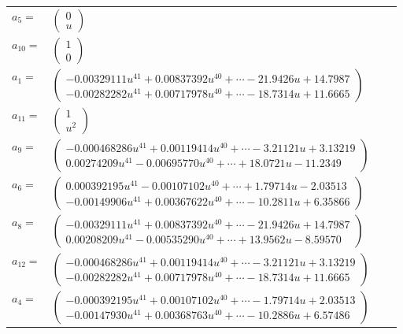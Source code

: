 \documentclass[1p]{elsarticle_modified}
\theoremstyle{definition}
\begin{document}
\begin{tabular}{m{7pt} m{180pt} m{7pt} m{180pt} }
\flushright $a_{5}=$&$\begin{pmatrix}0\\u\end{pmatrix}$ \\
\flushright $a_{10}=$&$\begin{pmatrix}1\\0\end{pmatrix}$ \\
\flushright $a_{1}=$&$\begin{pmatrix}-0.00329111 u^{41}+0.00837392 u^{40}+\cdots-21.9426 u+14.7987\\-0.00282282 u^{41}+0.00717978 u^{40}+\cdots-18.7314 u+11.6665\end{pmatrix}$ \\
\flushright $a_{11}=$&$\begin{pmatrix}1\\u^2\end{pmatrix}$ \\
\flushright $a_{9}=$&$\begin{pmatrix}-0.000468286 u^{41}+0.00119414 u^{40}+\cdots-3.21121 u+3.13219\\0.00274209 u^{41}-0.00695770 u^{40}+\cdots+18.0721 u-11.2349\end{pmatrix}$ \\
\flushright $a_{6}=$&$\begin{pmatrix}0.000392195 u^{41}-0.00107102 u^{40}+\cdots+1.79714 u-2.03513\\-0.00149906 u^{41}+0.00367622 u^{40}+\cdots-10.2811 u+6.35866\end{pmatrix}$ \\
\flushright $a_{8}=$&$\begin{pmatrix}-0.00329111 u^{41}+0.00837392 u^{40}+\cdots-21.9426 u+14.7987\\0.00208209 u^{41}-0.00535290 u^{40}+\cdots+13.9562 u-8.59570\end{pmatrix}$ \\
\flushright $a_{12}=$&$\begin{pmatrix}-0.000468286 u^{41}+0.00119414 u^{40}+\cdots-3.21121 u+3.13219\\-0.00282282 u^{41}+0.00717978 u^{40}+\cdots-18.7314 u+11.6665\end{pmatrix}$ \\
\flushright $a_{4}=$&$\begin{pmatrix}-0.000392195 u^{41}+0.00107102 u^{40}+\cdots-1.79714 u+2.03513\\-0.00147930 u^{41}+0.00368763 u^{40}+\cdots-10.2886 u+6.57486\end{pmatrix}$ \\

\end{tabular}
\end{document}
